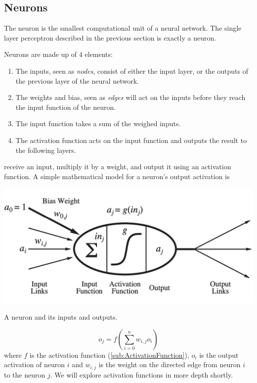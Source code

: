 \documentclass{tufte-handout}
\begin{document}
 \subsection{Neurons}%
  \label{sub:Neurons}
The neuron is the smallest computational unit of a neural network. The single layer perceptron described in the previous section is exactly a neuron.  
\begin{definition}[Neurons]
  Neurons are made up of 4 elements: 
  \begin{enumerate}
    \item The inputs, seen as \textit{nodes}, consist of either the input layer, or the outputs of the previous layer of the neural network. 
    \item The weights and bias, seen as \textit{edges} will act on the inputs before they reach the input function of the neuron. 
    \item The input function takes a sum of the weighed inputs. 
    \item The activation function acts on the input function and outputs the result to the following layers. 
  \end{enumerate}
   receive an input, multiply it by a weight, and output it using an activation function. A simple mathematical model for a neuron's output activation is\cite{book:AIModernApp}
\begin{marginfigure}
  \includegraphics{Neuron}
  \label{Neuron}
  \caption{A neuron and its inputs and outputs.}
\end{marginfigure}
  $$o_j = f \left( \sum^{n}_{i=0}w_{i,j} o_i  \right)$$
  where $f$ is the activation function (\ref{sub:ActivationFunction}), $o_i$ is the output activation of neuron $i$ and $w_{i,j}$ is the weight on the directed edge from neuron $i$ to the neuron $j$. We will explore activation functions in more depth shortly.  
\end{definition}
\begin{definition}[Weights]
\end{definition}
\end{document}
